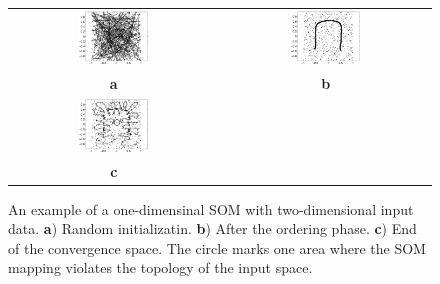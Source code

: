 \documentclass[10pt]{article}
\begin{document}
\begin{enumerate}
\begin{figure}[h]
\centering
\begin{tabular}{cc}
\includegraphics[width=0.35\textwidth]{v121-f1.eps} &
\includegraphics[width=0.35\textwidth]{v121-f2.eps} \\
{\bf a} &{\bf b}\\
\includegraphics[width=0.35\textwidth]{v121-f3f.eps} &\\
{\bf c} &
\end{tabular}
\caption{An example of a one-dimensinal SOM with two-dimensional input
data.  {\bf a}) Random initializatin. {\bf b}) After the ordering
phase. {\bf c}) End of the convergence space. The circle marks one
area where the SOM mapping violates the topology of the input space.}
\label{fig:som}
\end{figure}



%

\end{enumerate}
\end{document}
